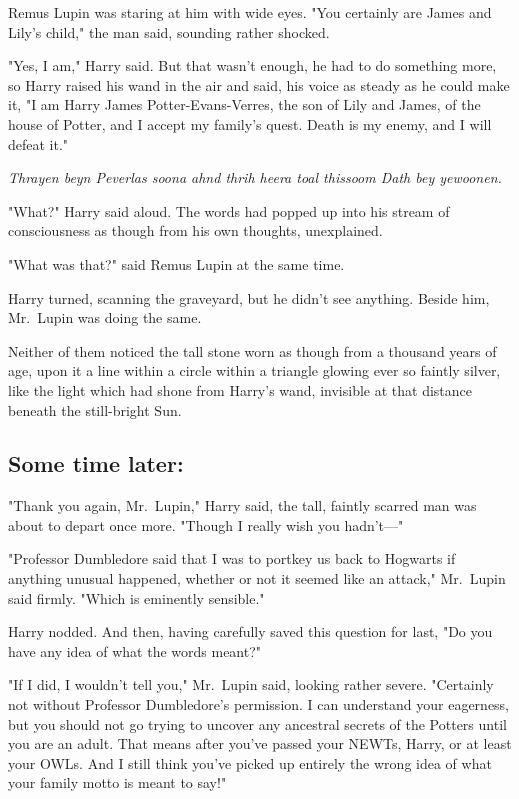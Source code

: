 Remus Lupin was staring at him with wide eyes. "You certainly are James and 
Lily's child," the man said, sounding rather shocked.

"Yes, I am," Harry said. But that wasn't enough, he had to do something more, 
so Harry raised his wand in the air and said, his voice as steady as he could 
make it, "I am Harry James Potter-Evans-Verres, the son of Lily and James, of 
the house of Potter, and I accept my family's quest. Death is my enemy, and I 
will defeat it."

\emph{Thrayen beyn Peverlas soona ahnd thrih heera toal thissoom Dath bey 
yewoonen.}

"What?" Harry said aloud. The words had popped up into his stream of 
consciousness as though from his own thoughts, unexplained.

"What was that?" said Remus Lupin at the same time.

Harry turned, scanning the graveyard, but he didn't see anything. Beside him, 
Mr.~Lupin was doing the same.

Neither of them noticed the tall stone worn as though from a thousand years of 
age, upon it a line within a circle within a triangle glowing ever so faintly 
silver, like the light which had shone from Harry's wand, invisible at that 
distance beneath the still-bright Sun.
\sbreak
\subsection{Some time later:}

"Thank you again, Mr.~Lupin," Harry said, the tall, faintly scarred man was 
about to depart once more. "Though I really wish you hadn't---"

"Professor Dumbledore said that I was to portkey us back to Hogwarts if 
anything unusual happened, whether or not it seemed like an attack," Mr.~Lupin 
said firmly. "Which is eminently sensible."

Harry nodded. And then, having carefully saved this question for last, "Do you 
have any idea of what the words meant?"

"If I did, I wouldn't tell you," Mr.~Lupin said, looking rather severe. 
"Certainly not without Professor Dumbledore's permission. I can understand your 
eagerness, but you should not go trying to uncover any ancestral secrets of the 
Potters until you are an adult. That means after you've passed your NEWTs, 
Harry, or at least your OWLs. And I still think you've picked up entirely the 
wrong idea of what your family motto is meant to say!"

